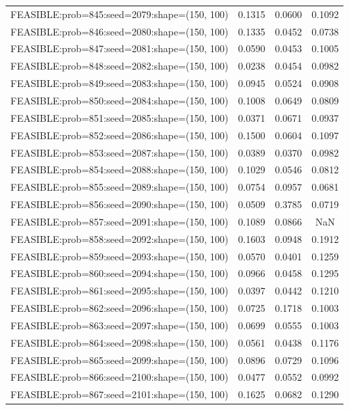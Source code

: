 \begin{longtable}{lccc}
FEASIBLE:prob=845:seed=2079:shape=(150, 100) & 0.1315 & 0.0600 & 0.1092 \\
FEASIBLE:prob=846:seed=2080:shape=(150, 100) & 0.1335 & 0.0452 & 0.0738 \\
FEASIBLE:prob=847:seed=2081:shape=(150, 100) & 0.0590 & 0.0453 & 0.1005 \\
FEASIBLE:prob=848:seed=2082:shape=(150, 100) & 0.0238 & 0.0454 & 0.0982 \\
FEASIBLE:prob=849:seed=2083:shape=(150, 100) & 0.0945 & 0.0524 & 0.0908 \\
FEASIBLE:prob=850:seed=2084:shape=(150, 100) & 0.1008 & 0.0649 & 0.0809 \\
FEASIBLE:prob=851:seed=2085:shape=(150, 100) & 0.0371 & 0.0671 & 0.0937 \\
FEASIBLE:prob=852:seed=2086:shape=(150, 100) & 0.1500 & 0.0604 & 0.1097 \\
FEASIBLE:prob=853:seed=2087:shape=(150, 100) & 0.0389 & 0.0370 & 0.0982 \\
FEASIBLE:prob=854:seed=2088:shape=(150, 100) & 0.1029 & 0.0546 & 0.0812 \\
FEASIBLE:prob=855:seed=2089:shape=(150, 100) & 0.0754 & 0.0957 & 0.0681 \\
FEASIBLE:prob=856:seed=2090:shape=(150, 100) & 0.0509 & 0.3785 & 0.0719 \\
FEASIBLE:prob=857:seed=2091:shape=(150, 100) & 0.1089 & 0.0866 &    NaN \\
FEASIBLE:prob=858:seed=2092:shape=(150, 100) & 0.1603 & 0.0948 & 0.1912 \\
FEASIBLE:prob=859:seed=2093:shape=(150, 100) & 0.0570 & 0.0401 & 0.1259 \\
FEASIBLE:prob=860:seed=2094:shape=(150, 100) & 0.0966 & 0.0458 & 0.1295 \\
FEASIBLE:prob=861:seed=2095:shape=(150, 100) & 0.0397 & 0.0442 & 0.1210 \\
FEASIBLE:prob=862:seed=2096:shape=(150, 100) & 0.0725 & 0.1718 & 0.1003 \\
FEASIBLE:prob=863:seed=2097:shape=(150, 100) & 0.0699 & 0.0555 & 0.1003 \\
FEASIBLE:prob=864:seed=2098:shape=(150, 100) & 0.0561 & 0.0438 & 0.1176 \\
FEASIBLE:prob=865:seed=2099:shape=(150, 100) & 0.0896 & 0.0729 & 0.1096 \\
FEASIBLE:prob=866:seed=2100:shape=(150, 100) & 0.0477 & 0.0552 & 0.0992 \\
FEASIBLE:prob=867:seed=2101:shape=(150, 100) & 0.1625 & 0.0682 & 0.1290 \\

\end{longtable}
